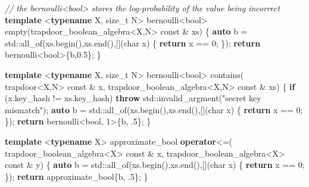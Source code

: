 \documentclass[
]{article}
\newenvironment{Shaded}{\begin{snugshade}}{\end{snugshade}}
\newcommand{\AttributeTok}[1]{\textcolor[rgb]{0.77,0.63,0.00}{#1}}
\newcommand{\BuiltInTok}[1]{#1}
\newcommand{\CommentTok}[1]{\textcolor[rgb]{0.56,0.35,0.01}{\textit{#1}}}
\newcommand{\ControlFlowTok}[1]{\textcolor[rgb]{0.13,0.29,0.53}{\textbf{#1}}}
\newcommand{\DataTypeTok}[1]{\textcolor[rgb]{0.13,0.29,0.53}{#1}}
\newcommand{\DecValTok}[1]{\textcolor[rgb]{0.00,0.00,0.81}{#1}}
\newcommand{\FloatTok}[1]{\textcolor[rgb]{0.00,0.00,0.81}{#1}}
\newcommand{\KeywordTok}[1]{\textcolor[rgb]{0.13,0.29,0.53}{\textbf{#1}}}
\newcommand{\NormalTok}[1]{#1}
\newcommand{\StringTok}[1]{\textcolor[rgb]{0.31,0.60,0.02}{#1}}
\begin{document}
\begin{Shaded}
\begin{Highlighting}[]
\CommentTok{// the bernoulli\textless{}bool\textgreater{} stores the log{-}probability of the value being incorrect}
\KeywordTok{template}\NormalTok{ \textless{}}\KeywordTok{typename}\NormalTok{ X, }\DataTypeTok{size\_t}\NormalTok{ N\textgreater{}}
\NormalTok{bernoulli\textless{}}\DataTypeTok{bool}\NormalTok{\textgreater{} empty(trapdoor\_boolean\_algebra\textless{}X,N\textgreater{} }\AttributeTok{const}\NormalTok{ \& xs)}
\NormalTok{\{}
    \KeywordTok{auto}\NormalTok{ b = }\BuiltInTok{std::}\NormalTok{all\_of(xs.begin(),xs.end(),[](}\DataTypeTok{char}\NormalTok{ x) \{ }\ControlFlowTok{return}\NormalTok{ x == }\DecValTok{0}\NormalTok{; \});}
    \ControlFlowTok{return}\NormalTok{ bernoulli\textless{}}\DataTypeTok{bool}\NormalTok{\textgreater{}\{b,}\FloatTok{0.5}\NormalTok{\};}
\NormalTok{\}}

\KeywordTok{template}\NormalTok{ \textless{}}\KeywordTok{typename}\NormalTok{ X, }\DataTypeTok{size\_t}\NormalTok{ N\textgreater{}}
\NormalTok{bernoulli\textless{}}\DataTypeTok{bool}\NormalTok{\textgreater{} contains(}
\NormalTok{    trapdoor\textless{}X,N\textgreater{} }\AttributeTok{const}\NormalTok{ \& x,}
\NormalTok{    trapdoor\_boolean\_algebra\textless{}X,N\textgreater{} }\AttributeTok{const}\NormalTok{ \& xs)}
\NormalTok{\{}
    \ControlFlowTok{if}\NormalTok{ (x.key\_hash != xs.key\_hash)}
        \ControlFlowTok{throw} \BuiltInTok{std::}\NormalTok{invalid\_argment(}\StringTok{"secret key mismatch"}\NormalTok{);}
    \KeywordTok{auto}\NormalTok{ b = }\BuiltInTok{std::}\NormalTok{all\_of(xs.begin(),xs.end(),[](}\DataTypeTok{char}\NormalTok{ x) \{ }\ControlFlowTok{return}\NormalTok{ x == }\DecValTok{0}\NormalTok{; \});}
    \ControlFlowTok{return}\NormalTok{ bernoulli\textless{}}\DataTypeTok{bool}\NormalTok{, }\DecValTok{1}\NormalTok{\textgreater{}\{b, }\FloatTok{.5}\NormalTok{\};}
\NormalTok{\}}

\KeywordTok{template}\NormalTok{ \textless{}}\KeywordTok{typename}\NormalTok{ X\textgreater{}}
\NormalTok{approximate\_bool }\KeywordTok{operator}\NormalTok{\textless{}=(}
\NormalTok{    trapdoor\_boolean\_algebra\textless{}X\textgreater{} }\AttributeTok{const}\NormalTok{ \& x,}
\NormalTok{    trapdoor\_boolean\_algebra\textless{}X\textgreater{} }\AttributeTok{const}\NormalTok{ \& y)}
\NormalTok{\{}
    \KeywordTok{auto}\NormalTok{ b = }\BuiltInTok{std::}\NormalTok{all\_of(xs.begin(),xs.end(),[](}\DataTypeTok{char}\NormalTok{ x) \{ }\ControlFlowTok{return}\NormalTok{ x == }\DecValTok{0}\NormalTok{; \});}
    \ControlFlowTok{return}\NormalTok{ approximate\_bool\{b, }\FloatTok{.5}\NormalTok{\};}
\NormalTok{\}}


\end{Highlighting}
\end{Shaded}
\end{document}
